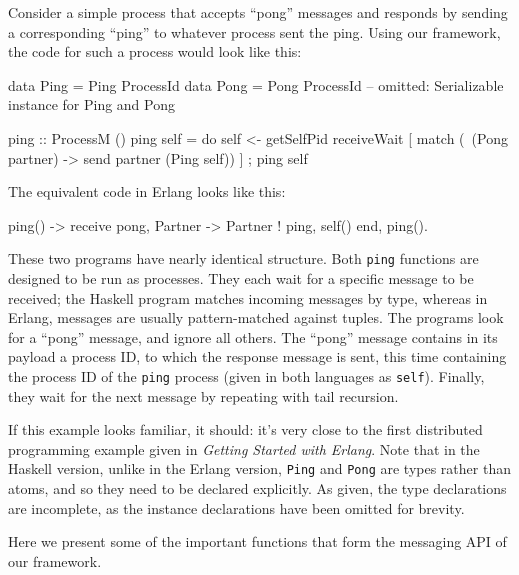 \documentclass[preprint]{sigplanconf}
\begin{document}
Consider a simple process that accepts ``pong'' messages and responds by sending a corresponding ``ping'' to whatever process sent the ping. Using our framework, the code for such a process would look like this:

\begin{code}[caption={Ping in Haskell}]
data Ping = Ping ProcessId
data Pong = Pong ProcessId
-- omitted: Serializable instance for Ping and Pong

ping :: ProcessM ()
ping self = 
   do { self <- getSelfPid
        receiveWait [
          match (\ (Pong partner) -> 
            send partner (Ping self)) ]
      ; ping self }
\end{code}

The equivalent code in Erlang looks like this:

\begin{code}[language=Erlang,caption={Ping in Erlang}]
ping() ->
  receive
    {pong, Partner} -> 
      Partner ! {ping, self()}
  end,
  ping().               
\end{code}

These two programs have nearly identical structure. Both \texttt{ping} functions are designed to be run as processes. They each wait for a specific message to be received; the Haskell program matches incoming messages by type, whereas in Erlang, messages are usually pattern-matched against tuples. The programs look for a ``pong'' message, and ignore all others. The ``pong'' message contains in its payload a process ID, to which the response message is sent, this time containing the process ID of the \texttt{ping} process (given in both languages as \texttt{self}). Finally, they wait for the next message by repeating with tail recursion.

If this example looks familiar, it should: it's very close to the first distributed programming example given in {\em Getting Started with Erlang}. Note that in the Haskell version, unlike in the Erlang version, \texttt{Ping} and \texttt{Pong} are types rather than atoms, and so they need to be declared explicitly. As given, the type declarations are incomplete, as the instance declarations have been omitted for brevity.

Here we present some of the important functions that form the messaging API of our framework.
\end{document}
